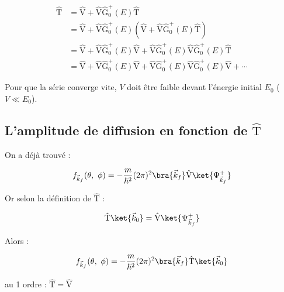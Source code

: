 \documentclass[12pt,a4paper,oneside,french]{book}
\newcommand{\opr}[1]{\mathrm{\hat{#1}}}
\theoremstyle{definition}
\theoremstyle{definition}
\theoremstyle{definition}
\theoremstyle{remark}
\theoremstyle{definition}
\begin{document}
    \begin{equation*}
    \begin{split}
        \opr{T}
            &= \opr{V} + \opr{V} {\opr{G}}_{0}^{+}(E) \opr{T} \\
            &= \opr{V} + \opr{V} {\opr{G}}_{0}^{+}(E) \left(\opr{V} + \opr{V} {\opr{G}}_{0}^{+}(E) \opr{T}\right) \\
            &= \opr{V} + \opr{V} {\opr{G}}_{0}^{+}(E) \opr{V} + \opr{V} {\opr{G}}_{0}^{+}(E)\opr{V} {\opr{G}}_{0}^{+}(E) \opr{T} \\
            &= \opr{V} + \opr{V} {\opr{G}}_{0}^{+}(E) \opr{V} + \opr{V} {\opr{G}}_{0}^{+}(E)\opr{V} {\opr{G}}_{0}^{+}(E) \opr{V} + \cdots
    \end{split}
    \end{equation*}

    Pour que la série converge vite, $V$ doit être faible devant l'énergie initial ${E}_{0}$ ($V \ll {E}_{0}$).
    
    \subsection{L'amplitude de diffusion en fonction de \texorpdfstring{$\opr{T}$}{T}}
    On a déjà trouvé :
    
    \begin{equation*}
        {f}_{{\vec{k}}_{f}}(\theta, \ \phi) = -\frac{m}{{\hbar}^{2}} (2\pi)^{2} \bra{{\vec{k}}_{f} \vphantom{{\Psi}_{{\vec{k}}_{f}}^{+}}} \opr{V} \ket{{\Psi}_{{\vec{k}}_{f}}^{+}}
    \end{equation*}
    
    Or selon la définition de $\opr{T}$ :
    
    \begin{equation*}
        \opr{T} \ket{{\vec{k}}_{0} \vphantom{{\Psi}_{{\vec{k}}_{f}}^{+}}} = \opr{V} \ket{{\Psi}_{{\vec{k}}_{f}}^{+}}
    \end{equation*}
    
    Alors :
    
    \begin{equation*}
        {f}_{{\vec{k}}_{f}}(\theta, \ \phi) = -\frac{m}{{\hbar}^{2}} (2\pi)^{2} \bra{{\vec{k}}_{f} \vphantom{{\Psi}_{{\vec{k}}_{f}}^{+}}} \opr{T} \ket{{\vec{k}}_{0} \vphantom{{\Psi}_{{\vec{k}}_{f}}^{+}}}
    \end{equation*}
    
    au 1 ordre : $\opr{T} = \opr{V}$
    
\end{document}
